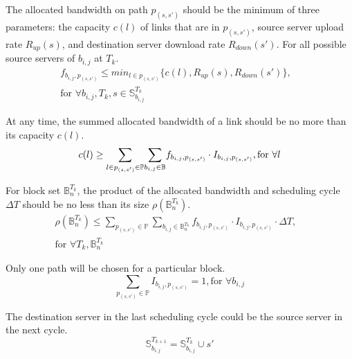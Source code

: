 \begin{packeditemize}

\item The allocated bandwidth on path $p_{(s,s')}$ should be the minimum of three parameters: the capacity $c(l)$ of links that are in $p_{(s,s')}$, source server upload rate $R_{up}(s)$, and destination server download rate $R_{down}(s')$. For all possible source servers of $b_{i,j}$ at $T_k$.
\begin{equation}
\begin{split}
f_{b_{i,j},p_{(s,s')}} \leq  \displaystyle{min_{l\in p_{(s,s')}}} \{c(l),R_{up}(s),R_{down}(s')\},& \\
\text{for }\forall b_{i,j}, T_k, s\in \mathbb{S}^{T_k}_{b_{i,j}}&
\end{split}
\end{equation}


\item At any time, the summed allocated bandwidth of a link should be no more than its capacity $c(l)$.
\begin{equation}
c(l) \geq  \displaystyle{\sum_{l\in p_{(s,s')}\in \mathbb{P}}} \displaystyle{\sum_{b_{i,j} \in \mathbb{B}}} f_{b_{i,j},p_{(s,s')}} \cdot I_{b_{i,j},p_{(s,s')}}, \text{for }\forall l\\
\end{equation}

\item For block set $\mathbb{B}^{T_k}_n$, the product of the allocated bandwidth and scheduling cycle $\Delta T$ should be no less than its size $\rho(\mathbb{B}^{T_k}_n)$.
\begin{equation}
\begin{split}
\rho(\mathbb{B}^{T_k}_n) \leq \displaystyle{\sum_{p_{(s,s')}\in \mathbb{P}}} \displaystyle{\sum_{b_{i,j} \in \mathbb{B}^{T_k}_n}} f_{b_{i,j},p_{(s,s')}} \cdot I_{b_{i,j},p_{(s,s')}} \cdot \Delta T,& \\
\text{for }\forall T_k, \mathbb{B}^{T_k}_n &
\end{split}
\end{equation}


\item Only one path will be chosen for a particular block.
\begin{equation}
\displaystyle{\sum_{p_{(s,s')} \in \mathbb{P}}} I_{b_{i,j},p_{(s,s')}} = 1, \text{for }\forall b_{i,j}
\end{equation}


\item The destination server in the last scheduling cycle could be the source server in the next cycle.
\begin{equation}
\mathbb{S}^{T_{k+1}}_{b_{i,j}} = \mathbb{S}^{T_k}_{b_{i,j}} \cup s'
\end{equation}
\end{packeditemize}


